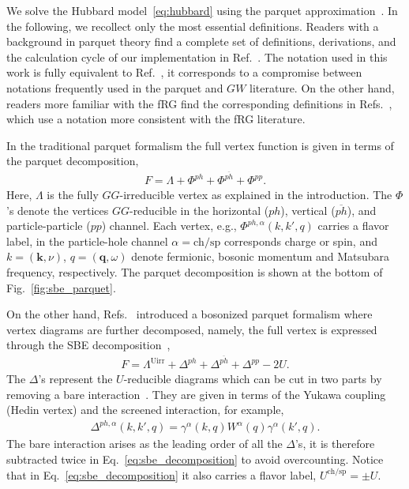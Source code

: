 \documentclass[epj]{svjour}
\newcommand{\kv}{\ensuremath{\mathbf{k}}}
\newcommand{\qv}{\ensuremath{\mathbf{q}}}
\newcommand{\ch}{\ensuremath{\text{ch}}}
\newcommand{\sz}{\ensuremath{\text{sp}}}
\newcommand{\pp}{\ensuremath{{pp}}}
\newcommand{\ph}{\ensuremath{{ph}}}
\newcommand{\phv}{\ensuremath{\overline{ph}}}
\begin{document}
We solve the Hubbard model~\eqref{eq:hubbard} using the parquet approximation~\cite{Diatlov57,Dominicis64-2}.
In the following, we recollect only the most essential definitions.
Readers with a background in parquet theory find a complete set of definitions, derivations,
and the calculation cycle of our implementation in Ref.~\cite{Krien21-2}.
The notation used in this work is fully equivalent to Ref.~\cite{Krien21-2},
it corresponds to a compromise between notations frequently used in the parquet and $GW$ literature.
On the other hand, readers more familiar with the fRG find the corresponding definitions in Refs.~\cite{Bonetti22,Walter22},
which use a notation more consistent with the fRG literature.

In the traditional parquet formalism the full vertex function is given in terms of the parquet decomposition,
\begin{align}
F=\Lambda+\Phi^{\ph}+\Phi^{\phv}+\Phi^{\pp}.\label{eq:parquet}
\end{align}
Here, $\Lambda$ is the fully $GG$-irreducible vertex as explained in the introduction.
The $\Phi$'s denote the vertices $GG$-reducible in the horizontal ($\ph$),
vertical ($\phv$), and particle-particle ($\pp$) channel.
Each vertex, e.g., $\Phi^{\ph,\alpha}(k,k',q)$ carries a flavor label,
in the particle-hole channel $\alpha=\ch/\sz$ corresponds charge or spin,
and $k=(\kv,\nu)$, $q=(\qv,\omega)$ denote fermionic, bosonic momentum and Matsubara frequency, respectively.
The parquet decomposition is shown at the bottom of Fig.~\ref{fig:sbe_parquet}.

On the other hand, Refs.~\cite{Krien20,Krien21-2} introduced a bosonized parquet formalism
where vertex diagrams are further decomposed, namely, the full vertex is expressed through the SBE decomposition~\cite{Krien19-2},
\begin{align}
F=\Lambda^\text{Uirr}+\Delta^{\ph}+\Delta^{\phv}+\Delta^{\pp}-2U.\label{eq:sbe_decomposition}
\end{align}
The $\Delta$'s represent the $U$-reducible diagrams which can
be cut in two parts by removing a bare interaction~\cite{Krien21-2,Walter22}.
They are given in terms of the Yukawa coupling (Hedin vertex) and the screened interaction, for example,
\begin{align}
\Delta^{\ph,\alpha}(k,k',q)=\gamma^\alpha(k,q)W^\alpha(q)\gamma^\alpha(k',q).\label{eq:delta}
\end{align}
The bare interaction arises as the leading order of all the $\Delta$'s,
it is therefore subtracted twice in Eq.~\eqref{eq:sbe_decomposition} to avoid overcounting.
Notice that in Eq.~\eqref{eq:sbe_decomposition} it also carries a flavor label, $U^{\ch/\sz}=\pm U$.
\end{document}
